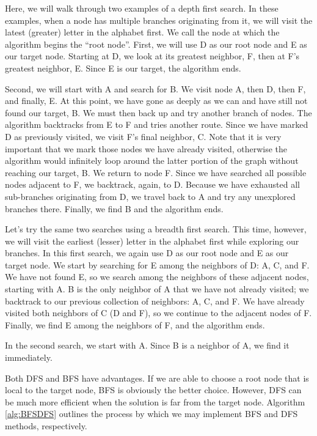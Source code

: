 Here, we will walk through two examples of a depth first search.
In these examples, when a node has multiple branches originating from it,
we will visit the latest (greater) letter in the alphabet first.
We call the node at which the algorithm begins the ``root node''.
First, we will use D as our root node and E as our target node.
Starting at D, we look at its greatest neighbor, F, then at F's greatest
neighbor, E. Since E is our target, the algorithm ends.

Second, we will start with A and search for B.
We visit node A, then D, then F, and finally, E.
At this point, we have gone as deeply as we can and have still not found our target, B.
We must then back up and try another branch of nodes.
The algorithm backtracks from E to F and tries another route.
Since we have marked D as previously visited, we visit F's final neighbor, C.
Note that it is very important that we mark those nodes we have already visited,
otherwise the algorithm would infinitely loop around the latter portion of
the graph without reaching our target, B. We return to node F. Since we have
searched all possible nodes adjacent to F, we backtrack, again, to D. Because we have
exhausted all sub-branches originating from D, we travel back to A and try
any unexplored branches there. Finally, we find B and the algorithm ends.

Let's try the same two searches using a breadth first search. This time, however,
we will visit the earliest (lesser) letter in the alphabet first while
exploring our branches. In this first search, we again use D as our root node and
E as our target node.
We start by searching for E among the neighbors of D: A, C, and F.
We have not found E, so we search among the neighbors of these adjacent nodes, starting with A.
B is the only neighbor of A that we have not already visited; we backtrack to our previous collection of neighbors: A, C, and F.
We have already visited both neighbors of C (D and F), so we continue to the adjacent nodes of F. Finally, we find E among the neighbors of F, and the algorithm ends.

In the second search, we start with A.
Since B is a neighbor of A, we find it immediately.

Both DFS and BFS have advantages.
If we are able to choose a root node that is local to the target node, BFS is obviously the better choice. However,
DFS can be much more efficient when the solution is far from the target node.
Algorithm \ref{alg:BFSDFS} outlines the process by which we may implement BFS and DFS methods, respectively.

